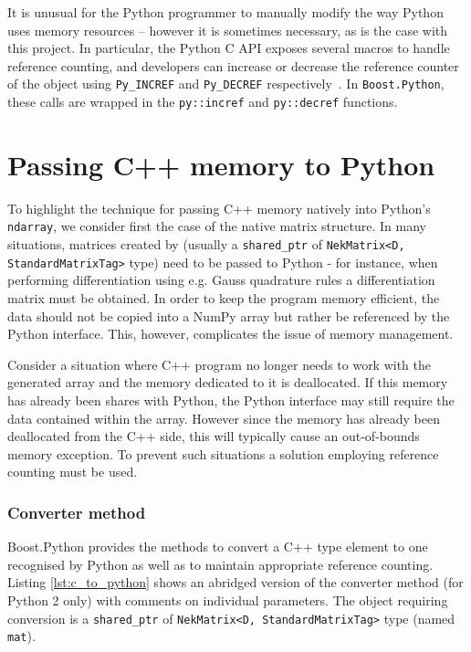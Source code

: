 It is unusual for the Python programmer to manually modify the way Python uses
memory resources -- however it is sometimes necessary, as is the case with this
project. In particular, the Python C API exposes several macros to handle
reference counting, and developers can increase or decrease the reference
counter of the object using \texttt{Py\_INCREF} and \texttt{Py\_DECREF}
respectively~\cite{PythonManualMemory}. In \texttt{Boost.Python}, these calls
are wrapped in the \texttt{py::incref} and \texttt{py::decref} functions.

\section{Passing C++ memory to Python}

To highlight the technique for passing C++ memory natively into Python's
\texttt{ndarray}, we consider first the case of the native \nek{} matrix
structure. In many situations, matrices created by \nek{} (usually a
\texttt{shared\_ptr} of \texttt{NekMatrix<D, StandardMatrixTag>} type) need to
be passed to Python - for instance, when performing differentiation using
e.g. Gauss quadrature rules a differentiation matrix must be obtained. In order
to keep the program memory efficient, the data should not be copied into a NumPy
array but rather be referenced by the Python interface. This, however,
complicates the issue of memory management.

Consider a situation where C++ program no longer needs to work with the
generated array and the memory dedicated to it is deallocated. If this memory
has already been shares with Python, the Python interface may still require the
data contained within the array. However since the memory has already been
deallocated from the C++ side, this will typically cause an out-of-bounds memory
exception. To prevent such situations a solution employing reference counting
must be used.

\subsubsection{Converter method}

Boost.Python provides the methods to convert a C++ type element to one recognised by 
Python as well as to maintain appropriate reference counting. Listing \ref{lst:c_to_python} 
shows an abridged version of the converter method (for Python 2 only) with comments on 
individual parameters. The object requiring conversion is a \texttt{shared\_ptr} of 
\texttt{NekMatrix<D, StandardMatrixTag>} type (named \texttt{mat}).


